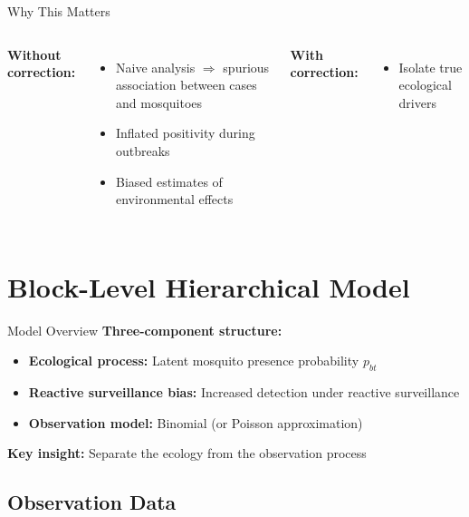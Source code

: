 \documentclass[aspectratio=169]{beamer}
\begin{document}
\begin{frame}{Why This Matters}
  \begin{columns}
    \textbf{Without correction:}
    \begin{itemize}
      \item Naive analysis $\Rightarrow$ spurious association between cases and mosquitoes
      \item Inflated positivity during outbreaks
      \item Biased estimates of environmental effects
    \end{itemize}
    
    \textbf{With correction:}
    \begin{itemize}
      \item Isolate true ecological drivers
    \end{itemize}
  \end{columns}
\end{frame}


\section{Block-Level Hierarchical Model}

\begin{frame}{Model Overview}
  \textbf{Three-component structure:}
  \begin{itemize}
    \item \textbf{Ecological process:} Latent mosquito presence probability $p_{bt}$
    \item \textbf{Reactive surveillance bias:} Increased detection under reactive surveillance
    \item \textbf{Observation model:} Binomial (or Poisson approximation)
  \end{itemize}
  
  \vspace{1cm}
  
  \textbf{Key insight:} Separate the ecology from the observation process
\end{frame}

\subsection{Observation Data}
\end{document}
